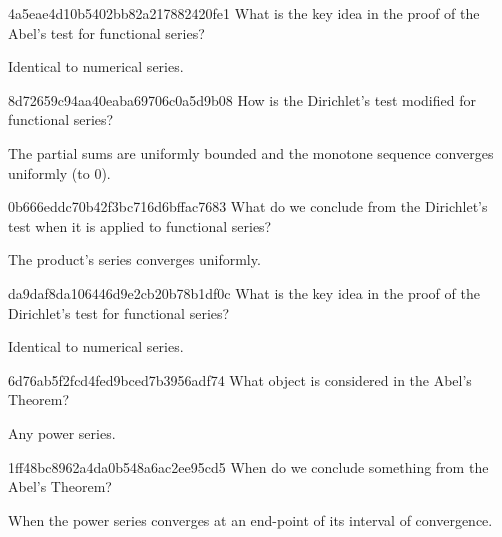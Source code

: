 \begin{note}{4a5eae4d10b5402bb82a217882420fe1}
    What is the key idea in the proof of the Abel's test for functional series?

    \begin{cloze}{1}
        Identical to numerical series.
    \end{cloze}
\end{note}

\begin{note}{8d72659c94aa40eaba69706c0a5d9b08}
   How is the Dirichlet's test modified for functional series?

   \begin{cloze}{1}
        The partial sums are uniformly bounded and the monotone sequence converges uniformly (to \({ 0 }\)).
   \end{cloze}
\end{note}

\begin{note}{0b666eddc70b42f3bc716d6bffac7683}
    What do we conclude from the Dirichlet's test when it is applied to functional series?

    \begin{cloze}{1}
        The product's series converges uniformly.
    \end{cloze}
\end{note}

\begin{note}{da9daf8da106446d9e2cb20b78b1df0c}
    What is the key idea in the proof of the Dirichlet's test for functional series?

    \begin{cloze}{1}
        Identical to numerical series.
    \end{cloze}
\end{note}

\begin{note}{6d76ab5f2fcd4fed9bced7b3956adf74}
    What object is considered in the Abel's Theorem?

    \begin{cloze}{1}
        Any power series.
    \end{cloze}
\end{note}

\begin{note}{1ff48bc8962a4da0b548a6ac2ee95cd5}
    When do we conclude something from the Abel's Theorem?

    \begin{cloze}{1}
        When the power series converges at an end-point of its interval of convergence.
    \end{cloze}
\end{note}

